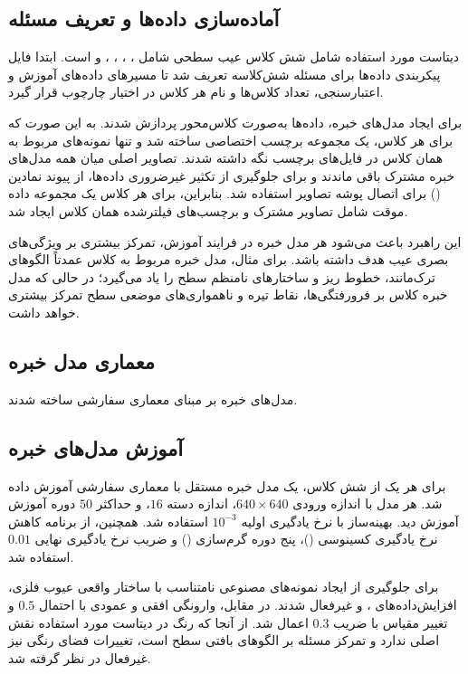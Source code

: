 \documentclass[a4paper, 10pt, twocolumn]{article}
\begin{document}
	\subsection{آماده‌سازی داده‌ها و تعریف مسئله}
	
	دیتاست مورد استفاده شامل شش کلاس عیب سطحی شامل ،
	، ، ،
	 و  است. ابتدا فایل پیکربندی داده‌ها
	برای مسئله شش‌کلاسه تعریف شد تا مسیرهای داده‌های آموزش و اعتبارسنجی، تعداد
	کلاس‌ها و نام هر کلاس در اختیار چارچوب  قرار گیرد.
	
	برای ایجاد مدل‌های خبره، داده‌ها به‌صورت کلاس‌محور پردازش شدند. به این
	صورت که برای هر کلاس، یک مجموعه برچسب اختصاصی ساخته شد و تنها نمونه‌های
	مربوط به همان کلاس در فایل‌های برچسب نگه داشته شدند. تصاویر اصلی میان همه
	مدل‌های خبره مشترک باقی ماندند و برای جلوگیری از تکثیر غیرضروری داده‌ها،
	از پیوند نمادین () برای اتصال پوشه تصاویر استفاده شد.
	بنابراین، برای هر کلاس یک مجموعه داده موقت شامل تصاویر مشترک و برچسب‌های
	فیلترشده همان کلاس ایجاد شد.
	
	این راهبرد باعث می‌شود هر مدل خبره در فرایند آموزش، تمرکز بیشتری بر
	ویژگی‌های بصری عیب هدف داشته باشد. برای مثال، مدل خبره مربوط به کلاس
	 عمدتاً الگوهای ترک‌مانند، خطوط ریز و ساختارهای نامنظم سطح را
	یاد می‌گیرد؛ در حالی که مدل خبره کلاس  بر فرورفتگی‌ها،
	نقاط تیره و ناهمواری‌های موضعی سطح تمرکز بیشتری خواهد داشت.
	
	\subsection{معماری مدل خبره}
	
	مدل‌های خبره بر مبنای معماری سفارشی  ساخته شدند.
	
	\subsection{آموزش مدل‌های خبره}
	
	برای هر یک از شش کلاس، یک مدل خبره مستقل با معماری سفارشی آموزش داده شد.
	هر مدل با اندازه ورودی \(640\times640\)، اندازه دسته \(16\)، و حداکثر
	\(50\) دوره آموزش آموزش دید. بهینه‌ساز  با نرخ یادگیری اولیه
	\(10^{-3}\) استفاده شد. همچنین، از برنامه کاهش نرخ یادگیری کسینوسی
	()، پنج دوره گرم‌سازی
	() و ضریب نرخ یادگیری نهایی \(0.01\) استفاده شد.
	
	برای جلوگیری از ایجاد نمونه‌های مصنوعی نامتناسب با ساختار واقعی عیوب
	فلزی، افزایش‌داده‌های ،  و  غیرفعال
	شدند. در مقابل، وارونگی افقی و عمودی با احتمال \(0.5\) و تغییر مقیاس
	با ضریب \(0.3\) اعمال شد. از آنجا که رنگ در دیتاست مورد استفاده نقش اصلی
	ندارد و تمرکز مسئله بر الگوهای بافتی سطح است، تغییرات فضای رنگی
	 نیز غیرفعال در نظر گرفته شد.
	
\end{document}
